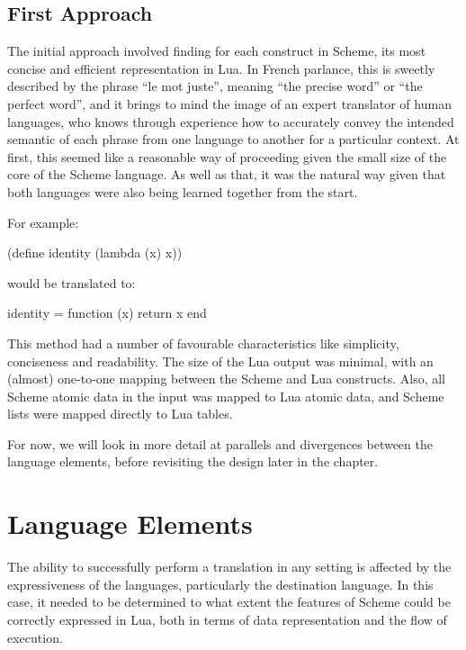 \subsection{First Approach}

The initial approach involved finding for each construct in Scheme, its most
concise and efficient representation in Lua. In French parlance, this is sweetly
described by the phrase ``le mot juste'', meaning ``the precise word'' or ``the
perfect word'', and it brings to mind the image of an expert translator of
human languages, who knows through experience how to accurately convey the
intended semantic of each phrase from one language to another for a particular
context. At first, this seemed like a reasonable way of proceeding given the
small size of the core of the Scheme language. As well as that, it was the
natural way given that both languages were also being learned together from the
start.

\begin{framed}
For example:
\begin{center}\ttfamily (define identity (lambda (x) x))\end{center}

would be translated to:
\begin{center}\ttfamily identity = function (x) return x end\end{center}
\end{framed}

This method had a number of favourable characteristics like simplicity,
conciseness and readability. The size of the Lua output was minimal, with an
(almost) one-to-one mapping between the Scheme and Lua constructs. Also, all
Scheme atomic data in the input was mapped to Lua atomic data, and Scheme lists
were mapped directly to Lua tables.

For now, we will look in more detail at parallels and divergences between the
language elements, before revisiting the design later in the chapter.


\section{Language Elements}

The ability to successfully perform a translation in any setting is affected by
the expressiveness of the languages, particularly the destination language. In
this case, it needed to be determined to what extent the features of Scheme
could be correctly expressed in Lua, both in terms of data representation and
the flow of execution.

